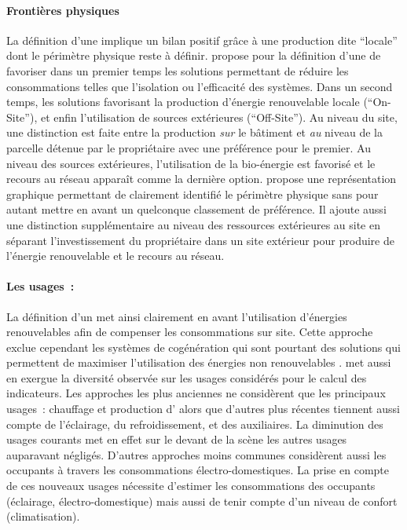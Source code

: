 \paragraph{Frontières physiques} %
\label{par:frontières_physiques}
La définition d’une  implique un bilan positif grâce à une production dite
\enquote{locale} dont le périmètre physique reste à définir.
\textcite{Torcellini2006} propose pour la définition d’une 
de favoriser dans un premier temps les solutions permettant de réduire les consommations
telles que l’isolation ou l’efficacité des systèmes. Dans un second temps, les solutions favorisant
la production d’énergie renouvelable locale (\enquote{On-Site}), et enfin
l’utilisation de sources extérieures (\enquote{Off-Site}). Au niveau du site, une
distinction est faite entre la production \emph{sur} le bâtiment et \emph{au} niveau de la
parcelle détenue par le propriétaire avec une préférence pour le premier.
Au niveau des sources extérieures, l’utilisation de la bio-énergie est favorisé et
le recours au réseau apparaît comme la dernière option.
\textcite{Marszal2010} propose une représentation graphique permettant de clairement
identifié le périmètre physique sans pour autant mettre en avant un quelconque
classement de préférence. Il ajoute aussi une distinction supplémentaire au niveau
des ressources extérieures au site en séparant l’investissement du propriétaire dans
un site extérieur pour produire de l’énergie renouvelable et le recours au réseau.

\paragraph{Les usages~:} %
\label{par:les_usages}
La définition d’un  met ainsi clairement en avant l’utilisation d’énergies
renouvelables afin de compenser les consommations sur site. Cette approche exclue
cependant les systèmes de cogénération qui sont pourtant des solutions qui permettent
de maximiser l’utilisation des énergies non renouvelables \parencite{Sartori2010}.
\textcite{Marszal2011971} met aussi en exergue la diversité observée sur les usages considérés pour le calcul
des indicateurs. Les approches les plus anciennes ne considèrent que les principaux usages~: chauffage
et production d’ alors que d’autres plus récentes tiennent aussi compte de l’éclairage,
du refroidissement, et des auxiliaires. La diminution des usages courants met en effet
sur le devant de la scène les autres usages auparavant négligés. D’autres approches
moins communes considèrent aussi les occupants à travers les consommations électro-domestiques.
La prise en compte de ces nouveaux usages nécessite d’estimer les consommations des occupants
(éclairage, électro-domestique) mais aussi de tenir compte d’un niveau de confort (climatisation).


